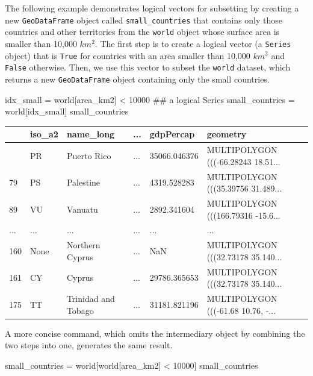 \documentclass[
  letterpaper,
]{krantz}
\newenvironment{Shaded}{\begin{snugshade}}{\end{snugshade}}
\newcommand{\CommentTok}[1]{\textcolor[rgb]{0.37,0.37,0.37}{#1}}
\newcommand{\DecValTok}[1]{\textcolor[rgb]{0.68,0.00,0.00}{#1}}
\newcommand{\NormalTok}[1]{\textcolor[rgb]{0.00,0.23,0.31}{#1}}
\newcommand{\OperatorTok}[1]{\textcolor[rgb]{0.37,0.37,0.37}{#1}}
\newcommand{\StringTok}[1]{\textcolor[rgb]{0.13,0.47,0.30}{#1}}
\begin{document}
The following example demonstrates logical vectors for subsetting by
creating a new \texttt{GeoDataFrame} object called
\texttt{small\_countries} that contains only those countries and other
territories from the \texttt{world} object whose surface area is smaller
than 10,000 \(km^2\). The first step is to create a logical vector (a
\texttt{Series} object) that is \texttt{True} for countries with an area
smaller than 10,000 \(km^2\) and \texttt{False} otherwise. Then, we use
this vector to subset the \texttt{world} dataset, which returns a new
\texttt{GeoDataFrame} object containing only the small countries.

\begin{Shaded}
\begin{Highlighting}[]
\NormalTok{idx\_small }\OperatorTok{=}\NormalTok{ world[}\StringTok{\textquotesingle{}area\_km2\textquotesingle{}}\NormalTok{] }\OperatorTok{\textless{}} \DecValTok{10000}  \CommentTok{\#\# a logical \textquotesingle{}Series\textquotesingle{}}
\NormalTok{small\_countries }\OperatorTok{=}\NormalTok{ world[idx\_small]}
\NormalTok{small\_countries}
\end{Highlighting}
\end{Shaded}

\begin{longtable}[]{@{}llllll@{}}
\toprule\noalign{}
& iso\_a2 & name\_long & ... & gdpPercap & geometry \\
\midrule\noalign{}
\endhead
\bottomrule\noalign{}
\endlastfoot
45 & PR & Puerto Rico & ... & 35066.046376 & MULTIPOLYGON (((-66.28243
18.51... \\
79 & PS & Palestine & ... & 4319.528283 & MULTIPOLYGON (((35.39756
31.489... \\
89 & VU & Vanuatu & ... & 2892.341604 & MULTIPOLYGON (((166.79316
-15.6... \\
... & ... & ... & ... & ... & ... \\
160 & None & Northern Cyprus & ... & NaN & MULTIPOLYGON (((32.73178
35.140... \\
161 & CY & Cyprus & ... & 29786.365653 & MULTIPOLYGON (((32.73178
35.140... \\
175 & TT & Trinidad and Tobago & ... & 31181.821196 & MULTIPOLYGON
(((-61.68 10.76, -... \\
\end{longtable}

A more concise command, which omits the intermediary object by combining
the two steps into one, generates the same result.

\begin{Shaded}
\begin{Highlighting}[]
\NormalTok{small\_countries }\OperatorTok{=}\NormalTok{ world[world[}\StringTok{\textquotesingle{}area\_km2\textquotesingle{}}\NormalTok{] }\OperatorTok{\textless{}} \DecValTok{10000}\NormalTok{]}
\NormalTok{small\_countries}
\end{Highlighting}
\end{Shaded}
\end{document}
